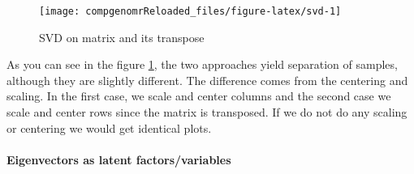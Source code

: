 \documentclass[12pt,]{krantz}
\newenvironment{Shaded}{\begin{snugshade}}{\end{snugshade}}
\newcommand{\CommentTok}[1]{\textcolor[rgb]{0.56,0.35,0.01}{\textit{#1}}}
\newcommand{\DataTypeTok}[1]{\textcolor[rgb]{0.13,0.29,0.53}{#1}}
\newcommand{\DecValTok}[1]{\textcolor[rgb]{0.00,0.00,0.81}{#1}}
\newcommand{\KeywordTok}[1]{\textcolor[rgb]{0.13,0.29,0.53}{\textbf{#1}}}
\newcommand{\NormalTok}[1]{#1}
\newcommand{\OperatorTok}[1]{\textcolor[rgb]{0.81,0.36,0.00}{\textbf{#1}}}
\newcommand{\OtherTok}[1]{\textcolor[rgb]{0.56,0.35,0.01}{#1}}
\newcommand{\StringTok}[1]{\textcolor[rgb]{0.31,0.60,0.02}{#1}}
\let\oldparagraph\paragraph
\renewcommand{\paragraph}[1]{\oldparagraph{#1}\mbox{}}
\theoremstyle{definition}
\theoremstyle{definition}
\theoremstyle{definition}
\theoremstyle{remark}
\begin{document}
\begin{Shaded}
\end{Shaded}

\begin{figure}

{\centering \texttt{[image: compgenomrReloaded\_files/figure-latex/svd-1]} 

}

\caption{SVD on matrix and its transpose}\label{fig:svd}
\end{figure}

As you can see in the figure \ref{fig:svd}, the two approaches yield
separation of samples, although they are slightly different. The
difference comes from the centering and scaling. In the first case, we
scale and center columns and the second case we scale and center rows
since the matrix is transposed. If we do not do any scaling or centering
we would get identical plots.

\hypertarget{eigenvectors-as-latent-factorsvariables}{%
\paragraph{Eigenvectors as latent
factors/variables}\label{eigenvectors-as-latent-factorsvariables}}
\end{document}
